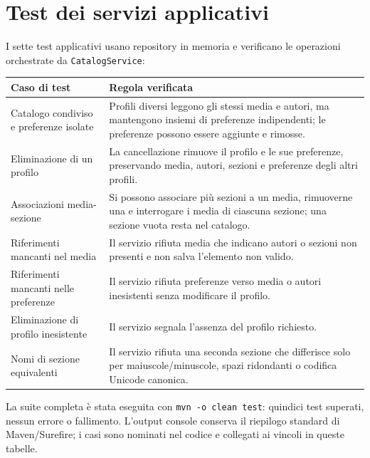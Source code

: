 \section{Test dei servizi applicativi}
I sette test applicativi usano repository in memoria e verificano le operazioni orchestrate da \texttt{CatalogService}:
\begin{center}
\small
\renewcommand{\arraystretch}{1.2}
\begin{tabular}{|p{5.2cm}|p{9.4cm}|}
\hline
\textbf{Caso di test} & \textbf{Regola verificata} \\
\hline
Catalogo condiviso e preferenze isolate & Profili diversi leggono gli stessi media e autori, ma mantengono insiemi di preferenze indipendenti; le preferenze possono essere aggiunte e rimosse. \\
\hline
Eliminazione di un profilo & La cancellazione rimuove il profilo e le sue preferenze, preservando media, autori, sezioni e preferenze degli altri profili. \\
\hline
Associazioni media-sezione & Si possono associare più sezioni a un media, rimuoverne una e interrogare i media di ciascuna sezione; una sezione vuota resta nel catalogo. \\
\hline
Riferimenti mancanti nel media & Il servizio rifiuta media che indicano autori o sezioni non presenti e non salva l'elemento non valido. \\
\hline
Riferimenti mancanti nelle preferenze & Il servizio rifiuta preferenze verso media o autori inesistenti senza modificare il profilo. \\
\hline
Eliminazione di profilo inesistente & Il servizio segnala l'assenza del profilo richiesto. \\
\hline
Nomi di sezione equivalenti & Il servizio rifiuta una seconda sezione che differisce solo per maiuscole/minuscole, spazi ridondanti o codifica Unicode canonica. \\
\hline
\end{tabular}
\end{center}

La suite completa è stata eseguita con \texttt{mvn -o clean test}: quindici test superati, nessun errore o fallimento. L'output console conserva il riepilogo standard di Maven/Surefire; i casi sono nominati nel codice e collegati ai vincoli in queste tabelle.
